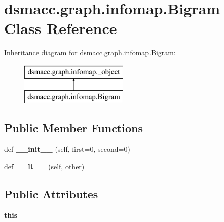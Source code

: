 \hypertarget{classdsmacc_1_1graph_1_1infomap_1_1Bigram}{}\section{dsmacc.\+graph.\+infomap.\+Bigram Class Reference}
\label{classdsmacc_1_1graph_1_1infomap_1_1Bigram}
Inheritance diagram for dsmacc.\+graph.\+infomap.\+Bigram\+:\begin{figure}[H]
\begin{center}
\leavevmode
\includegraphics[height=2.000000cm]{classdsmacc_1_1graph_1_1infomap_1_1Bigram}
\end{center}
\end{figure}
\subsection*{Public Member Functions}
\begin{DoxyCompactItemize}
\item 
\mbox{\label{classdsmacc_1_1graph_1_1infomap_1_1Bigram_a051ccb876a6ac967d3c59f86851dec6f}} 
def {\bfseries \+\_\+\+\_\+init\+\_\+\+\_\+} (self, first=0, second=0)
\item 
\mbox{\label{classdsmacc_1_1graph_1_1infomap_1_1Bigram_a1a8a5dbdbdc3ee2e513ce1284aa7412c}} 
def {\bfseries \+\_\+\+\_\+lt\+\_\+\+\_\+} (self, other)
\end{DoxyCompactItemize}
\subsection*{Public Attributes}
\begin{DoxyCompactItemize}
\item 
\mbox{\label{classdsmacc_1_1graph_1_1infomap_1_1Bigram_a6cbaa24f60b89982c7ec238a639614f0}} 
{\bfseries this}
\end{DoxyCompactItemize}
